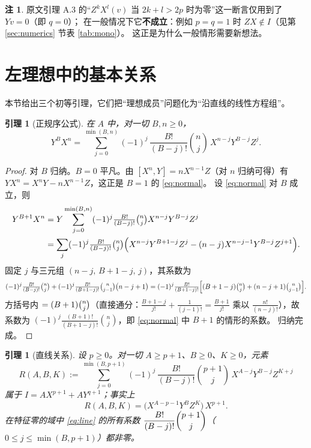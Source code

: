 \documentclass[11pt,UTF8]{ctexart}
\newtheorem{lemma}[theorem]{引理}
\theoremstyle{definition}
\newtheorem{remark}[theorem]{注}
\begin{document}
\begin{remark}
原文引理 A.3 的“$Z^kX^l(v)$ 当 $2k+l>2p$ 时为零”这一断言仅用到了 $Yv=0$（即 $q=0$）；
在一般情况下它\textbf{不成立}：例如 $p=q=1$ 时 $ZX\notin I$（见第 \ref{sec:numerics} 节表 \ref{tab:mono}）。
这正是为什么一般情形需要新想法。
\end{remark}

\section{左理想中的基本关系}\label{sec:relations}

本节给出三个初等引理，它们把“理想成员”问题化为“沿直线的线性方程组”。

\begin{lemma}[正规序公式]\label{lem:normal}
在 $A$ 中，对一切 $B,n\ge0$，
\begin{equation}\label{eq:normal}
Y^{B}X^{n}=\sum_{j=0}^{\min(B,n)}(-1)^{j}\,\frac{B!}{(B-j)!}\binom{n}{j}\,X^{n-j}Y^{B-j}Z^{j}.
\end{equation}
\end{lemma}

\begin{proof}
对 $B$ 归纳。$B=0$ 平凡。由 $[X^n,Y]=nX^{n-1}Z$（对 $n$ 归纳可得）有
$YX^{n}=X^{n}Y-nX^{n-1}Z$，这正是 $B=1$ 的 \eqref{eq:normal}。
设 \eqref{eq:normal} 对 $B$ 成立，则
\[
\begin{aligned}
Y^{B+1}X^{n}
&=Y\sum_{j=0}^{\min(B,n)}(-1)^{j}\tfrac{B!}{(B-j)!}\tbinom{n}{j}X^{n-j}Y^{B-j}Z^{j}\\
&=\sum_{j}(-1)^{j}\tfrac{B!}{(B-j)!}\tbinom{n}{j}
\Bigl(X^{n-j}Y^{B+1-j}Z^{j}-(n-j)X^{n-j-1}Y^{B-j}Z^{j+1}\Bigr).
\end{aligned}
\]
固定 $j$ 与三元组 $(n-j,\,B+1-j,\,j)$，其系数为
\[
(-1)^{j}\tfrac{B!}{(B-j)!}\tbinom{n}{j}+(-1)^{j}\tfrac{B!}{(B+1-j)!}\tbinom{n}{j-1}\bigl(n-j+1\bigr)
=(-1)^{j}\tfrac{B!}{(B+1-j)!}\Bigl[(B+1-j)\tbinom{n}{j}+(n-j+1)\tbinom{n}{j-1}\Bigr].
\]
方括号内 $=(B+1)\tbinom{n}{j}$（直接通分：$\frac{B+1-j}{j!}+\frac{1}{(j-1)!}=\frac{B+1}{j!}$ 乘以
$\frac{n!}{(n-j)!}$），故系数为
$(-1)^{j}\frac{(B+1)!}{(B+1-j)!}\binom{n}{j}$，即 \eqref{eq:normal} 中 $B+1$ 的情形的系数。
归纳完成。
\end{proof}

\begin{lemma}[直线关系]\label{lem:line}
设 $p\ge0$。对一切 $A\ge p+1$、$B\ge0$、$K\ge0$，元素
\begin{equation}\label{eq:line}
R(A,B,K):=\sum_{j=0}^{\min(B,p+1)}(-1)^{j}\,\frac{B!}{(B-j)!}\binom{p+1}{j}\,X^{A-j}Y^{B-j}Z^{K+j}
\end{equation}
属于 $I=AX^{p+1}+AY^{q+1}$；事实上
\begin{equation}\label{eq:line-exact}
R(A,B,K)=\bigl(X^{A-p-1}Y^{B}Z^{K}\bigr)\,X^{p+1}.
\end{equation}
在特征零的域中 \eqref{eq:line} 的所有系数 $\dfrac{B!}{(B-j)!}\dbinom{p+1}{j}$（$0\le j\le\min(B,p+1)$）都非零。
\end{lemma}
\end{document}
